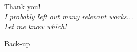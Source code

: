 \documentclass[aspectratio=169,11pt,usenames,dvipsnames]{beamer}
\begin{document}
\begin{frame}{}
    \vspace{20pt}
    \begin{center}
    {\huge\centering Thank you!} \\[20pt]

    \large \textit{I probably left out many relevant works...\\
     Let me know which!}
    \end{center}
\end{frame}

\begin{frame}{}
    \huge\centering Back-up
\end{frame}





\end{document}
